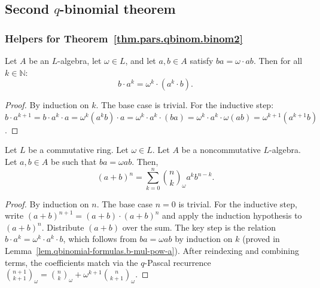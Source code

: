 \subsection{Second $q$-binomial theorem}

\subsubsection{Helpers for Theorem~\ref{thm.pars.qbinom.binom2}}

\begin{lemma}
\label{lem.qbinomial-formulas.b-mul-pow-a}
\leanhelper
\leanok
Let $A$ be an $L$-algebra, let $\omega \in L$, and let $a, b \in A$ satisfy $ba = \omega \cdot ab$.
Then for all $k \in \mathbb{N}$:
\[
b \cdot a^k = \omega^k \cdot (a^k \cdot b).
\]
\end{lemma}

\begin{proof}
\leanok
By induction on $k$. The base case is trivial. For the inductive step:
$b \cdot a^{k+1} = b \cdot a^k \cdot a = \omega^k (a^k b) \cdot a
= \omega^k \cdot a^k \cdot (ba) = \omega^k \cdot a^k \cdot \omega(ab)
= \omega^{k+1}(a^{k+1} b)$.
\end{proof}

\begin{theorem}
\label{thm.pars.qbinom.binom2}
\leantarget
\leanok
Let $L$ be a commutative ring. Let $\omega\in
L$. Let $A$ be a noncommutative $L$-algebra. Let $a,b\in A$ be such that
$ba=\omega ab$. Then,
\[
\left(  a+b\right)  ^{n}=\sum_{k=0}^{n}\binom{n}{k}_{\omega}a^{k}b^{n-k}.
\]
\end{theorem}

\begin{proof}
\leanok
By induction on $n$.
The base case $n=0$ is trivial.
For the inductive step, write $(a+b)^{n+1} = (a+b) \cdot (a+b)^n$
and apply the induction hypothesis to $(a+b)^n$.
Distribute $(a+b)$ over the sum.
The key step is the relation $b \cdot a^k = \omega^k \cdot a^k \cdot b$,
which follows from $ba = \omega ab$ by induction on $k$
(proved in Lemma~\ref{lem.qbinomial-formulas.b-mul-pow-a}).
After reindexing and combining terms, the coefficients match via
the $q$-Pascal recurrence $\binom{n+1}{k+1}_\omega = \binom{n}{k}_\omega + \omega^{k+1}\binom{n}{k+1}_\omega$.
\end{proof}

